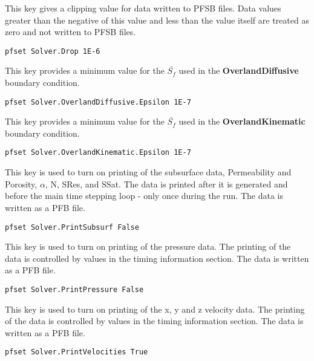 {
This key gives a clipping value for data written to PFSB
files.  Data values greater than the negative of this
value and less than the value itself are treated as zero
and not written to PFSB files.
}
\begin{display}\begin{verbatim}
pfset Solver.Drop 1E-6
\end{verbatim}\end{display}

{
This key provides a minimum value for the $\bar{S_{f}}$ used in the {\bf OverlandDiffusive} boundary condition.
}
\begin{display}\begin{verbatim}
pfset Solver.OverlandDiffusive.Epsilon 1E-7
\end{verbatim}\end{display}

{
This key provides a minimum value for the $\bar{S_{f}}$ used in the {\bf OverlandKinematic} boundary condition.
}
\begin{display}\begin{verbatim}
pfset Solver.OverlandKinematic.Epsilon 1E-7
\end{verbatim}\end{display}

{
This key is used to turn on printing of the subsurface data,
Permeability and Porosity, $\alpha$, N, SRes,
and SSat.  The data is printed after it is
generated and before the main time stepping loop - only once
during the run.  The data is written as a PFB file.
}
\begin{display}\begin{verbatim}
pfset Solver.PrintSubsurf False
\end{verbatim}\end{display}

{
This key is used to turn on printing of the pressure data.
The printing of the data is controlled by values in the
timing information section.  The data is written as a PFB
file.
}
\begin{display}\begin{verbatim}
pfset Solver.PrintPressure False
\end{verbatim}\end{display}

{
This key is used to turn on printing of the x, y and z
velocity data.  The printing of the data is controlled by
values in the timing information section.  The data is
written as a PFB file.
}
\begin{display}\begin{verbatim}
pfset Solver.PrintVelocities True
\end{verbatim}\end{display}

